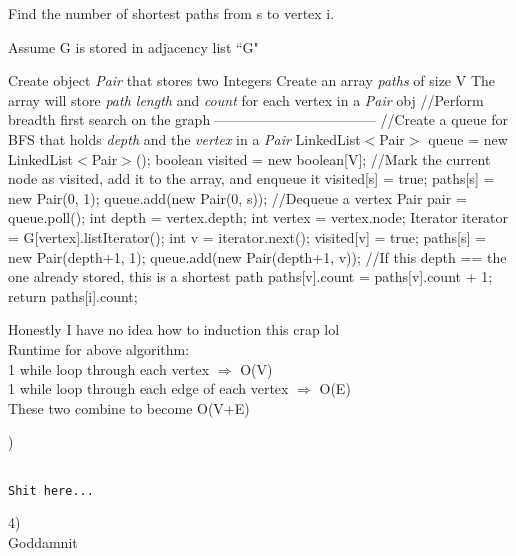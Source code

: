 \documentclass[12pt]{article}
\begin{document}
\begin{algorithm}[H]
\caption{Find the number of shortest paths from s to vertex i.}
\begin{algorithmic}
\STATE Assume G is stored in adjacency list ``G"

\STATE 
\STATE Create object \textit{Pair} that stores two Integers
\STATE Create an array \textit{paths} of size V
\STATE The array will store \textit{path length} and \textit{count} for each vertex in a \textit{Pair} obj
\STATE
\STATE //Perform breadth first search on the graph -----------------------------------
\STATE
\STATE //Create a queue for BFS that holds \textit{depth} and the \textit{vertex} in a \textit{Pair}
\STATE LinkedList$<$Pair$>$ queue = new LinkedList$<$Pair$>$();
\STATE boolean visited = new boolean[V];
\STATE
\STATE //Mark the current node as visited, add it to the array, and enqueue it 
\STATE visited[s] = true; 
\STATE paths[s] = new Pair(0, 1);
\STATE queue.add(new Pair(0, s)); 
\STATE
{}
\STATE //Dequeue a vertex
\STATE Pair pair = queue.poll(); 
\STATE int depth = vertex.depth;
\STATE int vertex = vertex.node;
\STATE
\STATE Iterator iterator = G[vertex].listIterator();
\STATE int v = iterator.next(); 
\STATE
{}
\STATE visited[v] = true; 
\STATE paths[s] = new Pair(depth+1, 1);
\STATE queue.add(new Pair(depth+1, v));
\STATE
{}
\STATE //If this depth == the one already stored, this is a shortest path
\STATE paths[v].count = paths[v].count + 1;
\ENDIF
\ENDWHILE
\ENDWHILE
\STATE return paths[i].count;

\end{algorithmic}
\end{algorithm}
Honestly I have no idea how to induction this crap lol\\
\noindent Runtime for above algorithm: \\
1 while loop through each vertex $\Rightarrow$ O(V)\\
1 while loop through each edge of each vertex $\Rightarrow$ O(E)\\
These two combine to become O(V+E)



\pagebreak


)
\begin{lstlisting}[label=some-code]

Shit here...

\end{lstlisting}

\pagebreak

4) \\
Goddamnit


\end{document}
